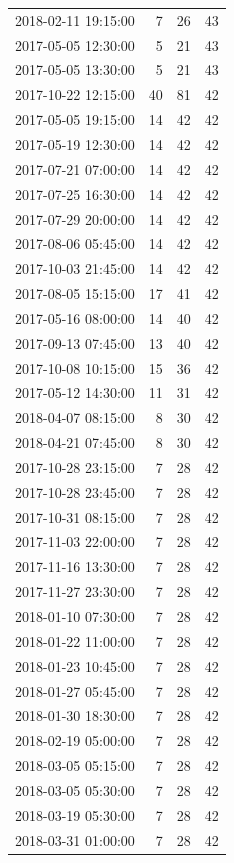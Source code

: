 \begin{tabular}{lrrr}
2018-02-11 19:15:00 & 7 & 26 & 43 \\
2017-05-05 12:30:00 & 5 & 21 & 43 \\
2017-05-05 13:30:00 & 5 & 21 & 43 \\
2017-10-22 12:15:00 & 40 & 81 & 42 \\
2017-05-05 19:15:00 & 14 & 42 & 42 \\
2017-05-19 12:30:00 & 14 & 42 & 42 \\
2017-07-21 07:00:00 & 14 & 42 & 42 \\
2017-07-25 16:30:00 & 14 & 42 & 42 \\
2017-07-29 20:00:00 & 14 & 42 & 42 \\
2017-08-06 05:45:00 & 14 & 42 & 42 \\
2017-10-03 21:45:00 & 14 & 42 & 42 \\
2017-08-05 15:15:00 & 17 & 41 & 42 \\
2017-05-16 08:00:00 & 14 & 40 & 42 \\
2017-09-13 07:45:00 & 13 & 40 & 42 \\
2017-10-08 10:15:00 & 15 & 36 & 42 \\
2017-05-12 14:30:00 & 11 & 31 & 42 \\
2018-04-07 08:15:00 & 8 & 30 & 42 \\
2018-04-21 07:45:00 & 8 & 30 & 42 \\
2017-10-28 23:15:00 & 7 & 28 & 42 \\
2017-10-28 23:45:00 & 7 & 28 & 42 \\
2017-10-31 08:15:00 & 7 & 28 & 42 \\
2017-11-03 22:00:00 & 7 & 28 & 42 \\
2017-11-16 13:30:00 & 7 & 28 & 42 \\
2017-11-27 23:30:00 & 7 & 28 & 42 \\
2018-01-10 07:30:00 & 7 & 28 & 42 \\
2018-01-22 11:00:00 & 7 & 28 & 42 \\
2018-01-23 10:45:00 & 7 & 28 & 42 \\
2018-01-27 05:45:00 & 7 & 28 & 42 \\
2018-01-30 18:30:00 & 7 & 28 & 42 \\
2018-02-19 05:00:00 & 7 & 28 & 42 \\
2018-03-05 05:15:00 & 7 & 28 & 42 \\
2018-03-05 05:30:00 & 7 & 28 & 42 \\
2018-03-19 05:30:00 & 7 & 28 & 42 \\
2018-03-31 01:00:00 & 7 & 28 & 42 \\

\end{tabular}
